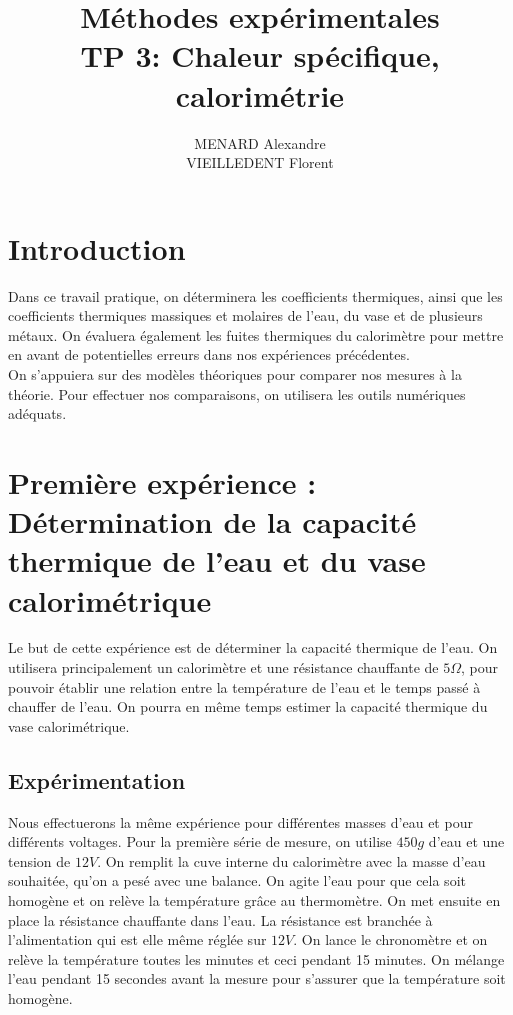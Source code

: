 \documentclass[12pt]{article}
\title{\textbf{Méthodes expérimentales} \\ TP 3: Chaleur spécifique, calorimétrie}
\author{MENARD Alexandre \\ VIEILLEDENT Florent}
\begin{document}
\maketitle

\section*{Introduction}
Dans ce travail pratique, on déterminera les coefficients thermiques, ainsi que les coefficients thermiques
massiques et molaires de l'eau, du vase et de plusieurs métaux. On évaluera également les fuites thermiques du calorimètre pour mettre
en avant de potentielles erreurs dans nos expériences précédentes. \\
On s'appuiera sur des modèles théoriques pour comparer nos mesures à la théorie. Pour effectuer nos comparaisons, on utilisera
les outils numériques adéquats.


\newpage

\section{Première expérience : Détermination de la capacité thermique de l'eau et du vase calorimétrique}

Le but de cette expérience est de déterminer la capacité thermique de l'eau. On utilisera principalement un calorimètre et une résistance chauffante de $5 \Omega$, 
pour pouvoir établir une relation entre la température de l'eau et le temps passé à chauffer de l'eau. 
On pourra en même temps estimer la capacité thermique du vase calorimétrique. 

\subsection{Expérimentation}

Nous effectuerons la même expérience pour différentes masses d'eau et pour différents voltages. Pour la première série de mesure, on utilise $450g$ d'eau et une tension de $12V$. On remplit la cuve interne du calorimètre avec la masse d'eau souhaitée, qu'on a pesé avec une balance. On agite l'eau pour que cela soit homogène et on relève la température grâce au thermomètre. On met ensuite en place la résistance chauffante dans l'eau. La résistance est branchée à l'alimentation qui est elle même réglée sur $12V$. On lance le chronomètre et on relève la température toutes les minutes et ceci pendant 15 minutes. On mélange l'eau pendant 15 secondes avant la mesure pour s'assurer que la température soit homogène. 
\end{document}
